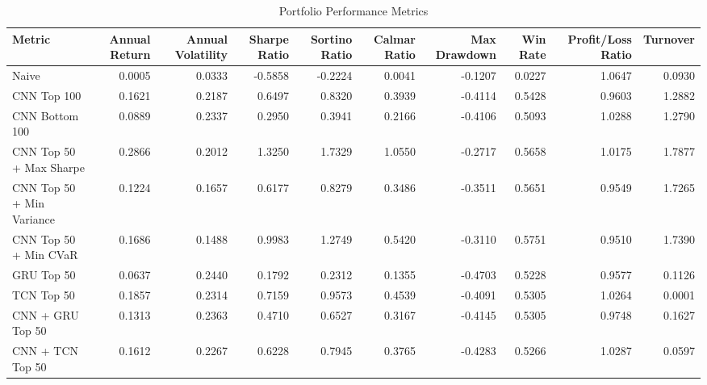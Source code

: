 \begin{table}[htbp]
\centering
\caption{Portfolio Performance Metrics}
\begin{tabular}{lrrrrrrrrr}
\hline
Metric & Annual Return & Annual Volatility & Sharpe Ratio & Sortino Ratio & Calmar Ratio & Max Drawdown & Win Rate & Profit/Loss Ratio & Turnover \\
\hline
Naive & 0.0005 & 0.0333 & -0.5858 & -0.2224 & 0.0041 & -0.1207 & 0.0227 & 1.0647 & 0.0930 \\
CNN Top 100 & 0.1621 & 0.2187 & 0.6497 & 0.8320 & 0.3939 & -0.4114 & 0.5428 & 0.9603 & 1.2882 \\
CNN Bottom 100 & 0.0889 & 0.2337 & 0.2950 & 0.3941 & 0.2166 & -0.4106 & 0.5093 & 1.0288 & 1.2790 \\
CNN Top 50 + Max Sharpe & 0.2866 & 0.2012 & 1.3250 & 1.7329 & 1.0550 & -0.2717 & 0.5658 & 1.0175 & 1.7877 \\
CNN Top 50 + Min Variance & 0.1224 & 0.1657 & 0.6177 & 0.8279 & 0.3486 & -0.3511 & 0.5651 & 0.9549 & 1.7265 \\
CNN Top 50 + Min CVaR & 0.1686 & 0.1488 & 0.9983 & 1.2749 & 0.5420 & -0.3110 & 0.5751 & 0.9510 & 1.7390 \\
GRU Top 50 & 0.0637 & 0.2440 & 0.1792 & 0.2312 & 0.1355 & -0.4703 & 0.5228 & 0.9577 & 0.1126 \\
TCN Top 50 & 0.1857 & 0.2314 & 0.7159 & 0.9573 & 0.4539 & -0.4091 & 0.5305 & 1.0264 & 0.0001 \\
CNN + GRU Top 50 & 0.1313 & 0.2363 & 0.4710 & 0.6527 & 0.3167 & -0.4145 & 0.5305 & 0.9748 & 0.1627 \\
CNN + TCN Top 50 & 0.1612 & 0.2267 & 0.6228 & 0.7945 & 0.3765 & -0.4283 & 0.5266 & 1.0287 & 0.0597 \\
\hline
\end{tabular}
\end{table}